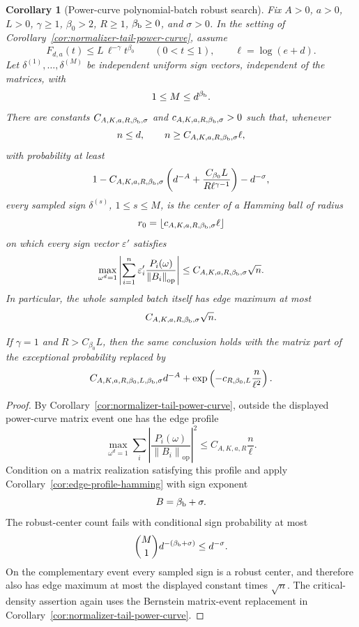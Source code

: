 \documentclass[11pt]{amsart}
\numberwithin{equation}{section}
\newtheorem{corollary}[theorem]{Corollary}
\theoremstyle{definition}
\theoremstyle{remark}
\newcommand{\op}{\mathrm{op}}
\newcommand{\norm}[1]{\left\lVert #1\right\rVert}
\newcommand{\eps}{\varepsilon}
\begin{document}
\begin{corollary}[Power-curve polynomial-batch robust search]
\label{cor:normalizer-tail-power-poly-batch}
Fix \(A>0\), \(a>0\), \(L>0\), \(\gamma\ge1\), \(\beta_0>2\), \(R\ge1\),
\(\beta_{\rm b}\ge0\), and \(\sigma>0\).  In the setting of
Corollary~\ref{cor:normalizer-tail-power-curve}, assume
\[
  F_{d,a}(t)\le L\,\ell^{-\gamma}t^{\beta_0}
  \qquad(0<t\le1),
  \qquad \ell=\log(e+d).
\]
Let \(\delta^{(1)},\ldots,\delta^{(M)}\) be independent uniform sign vectors,
independent of the matrices, with
\[
  1\le M\le d^{\beta_{\rm b}} .
\]
There are constants \(C_{A,K,a,R,\beta_{\rm b},\sigma}\) and
\(c_{A,K,a,R,\beta_{\rm b},\sigma}>0\) such that, whenever
\[
  n\le d,\qquad n\ge C_{A,K,a,R,\beta_{\rm b},\sigma}\ell ,
\]
with probability at least
\[
  1-C_{A,K,a,R,\beta_{\rm b},\sigma}
  \left(d^{-A}+\frac{C_{\beta_0}L}{R\ell^{\gamma-1}}\right)-d^{-\sigma},
\]
every sampled sign \(\delta^{(s)}\), \(1\le s\le M\), is the center of a
Hamming ball of radius
\[
  r_0=\left\lfloor c_{A,K,a,R,\beta_{\rm b},\sigma}\ell\right\rfloor
\]
on which every sign vector \(\eps'\) satisfies
\[
  \max_{\omega^d=1}\left|\sum_{i=1}^n
  \eps'_i\frac{P_i(\omega)}{\norm{B_i}_{\op}}\right|
  \le C_{A,K,a,R,\beta_{\rm b},\sigma}\sqrt n .
\]
In particular, the whole sampled batch itself has edge maximum at most
\[
  C_{A,K,a,R,\beta_{\rm b},\sigma}\sqrt n .
\]

If \(\gamma=1\) and \(R>C_{\beta_0}L\), then the same conclusion holds with the
matrix part of the exceptional probability replaced by
\[
  C_{A,K,a,R,\beta_0,L,\beta_{\rm b},\sigma}d^{-A}
  +\exp\left(-c_{R,\beta_0,L}\frac n{\ell^2}\right).
\]
\end{corollary}

\begin{proof}
By Corollary~\ref{cor:normalizer-tail-power-curve}, outside the displayed
power-curve matrix event one has the edge profile
\[
  \max_{\omega^d=1}\sum_i
  \left|\frac{P_i(\omega)}{\norm{B_i}_{\op}}\right|^2
  \le C_{A,K,a,R}\frac n\ell .
\]
Condition on a matrix realization satisfying this profile and apply
Corollary~\ref{cor:edge-profile-hamming} with sign exponent
\[
  B=\beta_{\rm b}+\sigma .
\]
The robust-center count fails with conditional sign probability at most
\[
  \binom{M}{1}d^{-(\beta_{\rm b}+\sigma)}
  \le d^{-\sigma}.
\]
On the complementary event every sampled sign is a robust center, and therefore
also has edge maximum at most the displayed constant times \(\sqrt n\).  The
critical-density assertion again uses the Bernstein matrix-event replacement in
Corollary~\ref{cor:normalizer-tail-power-curve}.
\end{proof}
\end{document}
